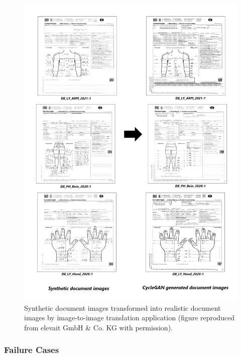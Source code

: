 \begin{figure}[H]
        \begin{center}
	    \includegraphics[scale=0.30]{images/Evaluation/Qualitative_Results.png}
	    \caption[Synthetic document images transformed into realistic document images by the image-to-image translation application.]{Synthetic document images transformed into realistic document images by image-to-image translation application (figure reproduced from elevait GmbH \& Co. KG with permission).}
	    \label{fig:QualitativeResults}
	    \end{center}
\end{figure}


\subsubsection{Failure Cases}\label{FailureCases}


